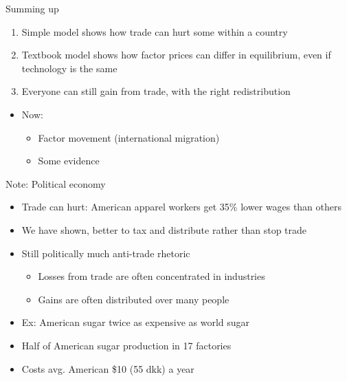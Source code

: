 \documentclass[ignorenonframetext,]{beamer}
\begin{document}
\begin{frame}{Summing up}

    \begin{enumerate}
        \item Simple model shows how trade can hurt some within a country
        \item Textbook model shows how factor prices can differ in equilibrium, even if technology is the same
        \item Everyone can still gain from trade, with the right redistribution
    \end{enumerate}
    \begin{itemize}
        \item Now:
        \begin{itemize}
            \item Factor movement (international migration)
            \item Some evidence
        \end{itemize}
    \end{itemize}

\end{frame}

\begin{frame}{Note: Political economy}

    \begin{itemize}
        \item Trade can hurt: American apparel workers get 35\% lower wages than others
        \item We have shown, better to tax and distribute rather than stop trade
        \item Still politically much anti-trade rhetoric 
        \begin{itemize}
            \item Losses from trade are often concentrated in industries
            \item Gains are often distributed over many people 
        \end{itemize}
        \item Ex: American sugar twice as expensive as world sugar
        \item Half of American sugar production in 17 factories
        \item Costs avg. American \$10 (55 dkk) a year
    \end{itemize}

\end{frame}
\end{document}
